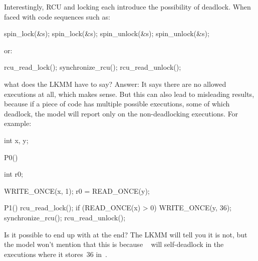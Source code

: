 Interestingly, RCU and locking each introduce the possibility of
deadlock.
When faced with code sequences such as:

\begin{VerbatimU}
	spin_lock(&s);
	spin_lock(&s);
	spin_unlock(&s);
	spin_unlock(&s);
\end{VerbatimU}

\noindent%
or:

\begin{VerbatimU}
	rcu_read_lock();
	synchronize_rcu();
	rcu_read_unlock();
\end{VerbatimU}

\noindent%
what does the LKMM have to say?
Answer:
It says there are no allowed
executions at all, which makes sense.
But this can also lead to
misleading results, because if a piece of code has multiple possible
executions, some of which deadlock, the model will report only on the
non-deadlocking executions.
For example:

\begin{VerbatimU}
	int x, y;

	P0()
	{
		int r0;

		WRITE_ONCE(x, 1);
		r0 = READ_ONCE(y);
	}

	P1()
	{
		rcu_read_lock();
		if (READ_ONCE(x) > 0) {
			WRITE_ONCE(y, 36);
			synchronize_rcu();
		}
		rcu_read_unlock();
	}
\end{VerbatimU}

Is it possible to end up with  at the end?
The LKMM will tell
you it is not, but the model won't mention that this is because ~%
will self-deadlock in the executions where it stores~36 in~.
